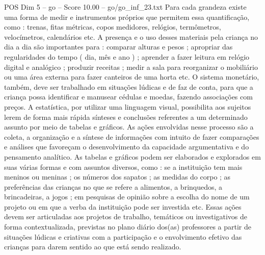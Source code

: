 \begin{textsample}{POS Dim 5 – go – Score 10.00 – go/go\_inf\_23.txt}
Para cada grandeza existe uma forma de medir e instrumentos próprios que permitem essa quantificação, como : trenas, fitas métricas, copos medidores, relógios, termômetros, velocímetros, calendários etc.
A presença e o uso desses materiais pela criança no dia a dia são importantes para : comparar alturas e pesos ; apropriar das regularidades do tempo ( dia, mês e ano ) ; aprender a fazer leitura em relógio digital e analógico ; produzir receitas ; medir a sala para reorganizar o mobiliário ou uma área externa para fazer canteiros de uma horta etc.
O sistema monetário, também, deve ser trabalhado em situações lúdicas e de faz de conta, para que a criança possa identificar e manusear cédulas e moedas, fazendo associações com preços.
A estatística, por utilizar uma linguagem visual, possibilita aos sujeitos lerem de forma mais rápida sínteses e conclusões referentes a um determinado assunto por meio de tabelas e gráficos.
As ações envolvidas nesse processo são a coleta, a organização e a síntese de informações com intuito de fazer comparações e análises que favoreçam o desenvolvimento da capacidade argumentativa e do pensamento analítico.
As tabelas e gráficos podem ser elaborados e explorados em suas várias formas e com assuntos diversos, como : se a instituição tem mais meninos ou meninas ; os números dos sapatos ; as medidas do corpo ; as preferências das crianças no que se refere a alimentos, a brinquedos, a brincadeiras, a jogos ; em pesquisas de opinião sobre a escolha do nome de um projeto ou em que a verba da instituição pode ser investida etc.
Essas ações devem ser articuladas aos projetos de trabalho, temáticos ou investigativos de forma contextualizada, previstas no plano diário dos(as) professores a partir de situações lúdicas e criativas com a participação e o envolvimento efetivo das crianças para darem sentido ao que está sendo realizado.

\end{textsample}
